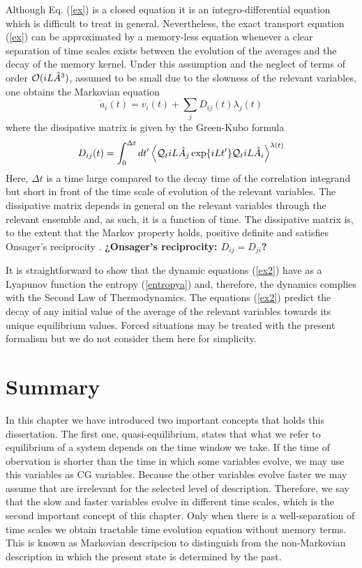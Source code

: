 \documentclass[b5paper,openright,11pt]{book}
\newcommand{\Note}[1]{{\bf \color{red}#1}}    %
\begin{document}
Although Eq.  (\ref{ex})  is a closed
equation it is an integro-differential  equation which is difficult to
treat  in   general.   Nevertheless,  the  exact   transport  equation
(\ref{ex}) can  be approximated by  a memory-less equation  whenever a
clear separation  of time scales  exists between the evolution  of the
averages and  the decay of  the memory kernel. Under  this assumption
and the  neglect of terms of  order ${\cal O}( iL\hat{A}^3)$,  assumed to be
small due to  the slowness of the relevant variables,  one obtains the
Markovian equation \cite{Grabert1982}
\begin{equation}
\dot{a}_i(t) = v_i(t) + \sum_j D_{ij}(t) \lambda_j(t)
\label{ex2}
\end{equation}
where  the  dissipative matrix  is  given  by  the Green-Kubo  formula
\begin{equation}
D_{ij}(t)=\int_0^{\Delta t} dt'\left\langle 
{\cal Q}_t iL\hat{A}_j\exp\{iLt'\}{\cal Q}_t iL\hat{A}_i
\right\rangle^{\lambda(t)}
\label{dij}
\end{equation}
Here,  $\Delta t$ is  a  time large  compared  to the  decay  time of  the
correlation  integrand  but  short  in  front of  the  time  scale  of
evolution of  the relevant variables.  The  dissipative matrix depends
in general  on the  relevant variables  through the  relevant ensemble
and, as such, it is a function of time.  The dissipative matrix is, to
the  extent that  the  Markov property  holds,  positive definite  and
satisfies Onsager's reciprocity \cite{Grabert1982}. \Note{¿Onsager's reciprocity: $D_{ij}=D_{ji}$?}

It is straightforward  to show that the  dynamic equations (\ref{ex2})
have  as  a  Lyapunov   function  the  entropy  (\ref{entropya})  and,
therefore,   the   dynamics   complies   with  the   Second   Law   of
Thermodynamics.  The  equations (\ref{ex2})  predict the decay  of any
initial value  of the  average of the  relevant variables  towards its
unique equilibrium  values. Forced situations may  be treated
with the present  formalism \cite{Grabert1982} but we  do not consider
them here for simplicity.


\section{Summary}

In this chapter we have introduced two important concepts that holds this dissertation. The first one, quasi-equilibrium, states that what we refer to equilibrium of a system depends on the time window we take. If the time of obervation is shorter than the time in which some variables evolve, we may use this variables as CG variables. Because the other variables evolve faster we may assume that are irrelevant for the selected level of description. Therefore, we say that the slow and faster variables evolve in different time scales, which is the second important concept of this chapter. Only when there is a well-separation of time scales we obtain tractable time evolution equation without memory terms. This is known as Markovian descripcion to distinguish from the non-Markovian description in which the present state is determined by the past. 
\end{document}
